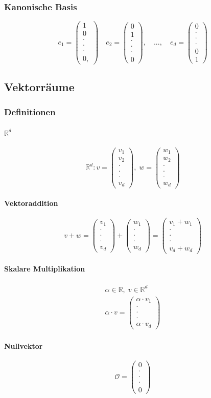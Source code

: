 \documentclass[12pt,a4paper]{article}%
\numberwithin{equation}{section}
\newcommand{\R}{\mathbb{R}} %
\newcommand{\subsubsubsection}{\paragraph}
\def\vecT#1{\left(\begin{array}{c} #1 \end{array}\right)}
\def\dddot{\cdot \\ \cdot \\ \cdot}
\def\vecD#1{\vecT{#1_1 \\ \dddot \\ #1_d}}
\numberwithin{equation}{subsection}
\begin{document}
  \subsubsection{Kanonische Basis}
  \begin{equation}
    e_1 = \vecT{1\\0\\ \dddot \\ 0,} \quad e_2 = \vecT{0\\1\\ \dddot \\ 0}, \quad ..., \quad e_d = \vecT{0\\ \dddot \\0 \\1}
  \end{equation}
	\subsection{Vektorräume}
		\subsubsection{Definitionen}
		\subsubsubsection{$\R^d$}
		\begin{equation}
			\R^d: v = \vecT{v_1\\v_2\\ \dddot \\v_d},\; w = \vecT{w_1\\w_2\\ \dddot \\ w_d}
		\end{equation}	
		\subsubsubsection{Vektoraddition}
		\begin{equation}
			v + w = \vecD{v} + \vecD{w} = \vecT{v_1 + w_1 \\ \dddot \\ v_d + w_d}
		\end{equation}
		\subsubsubsection{Skalare Multiplikation}
		\begin{align}
			\alpha \in \R, \; v \in \R^d \nonumber \\
			\alpha \cdot v = \vecD{\alpha\cdot v}
		\end{align}
		\subsubsubsection{Nullvektor}
		\begin{equation}
		  \mathcal{O} = \vecT{0 \\ \dddot \\ 0}
    \end{equation}		
    
\end{document}
